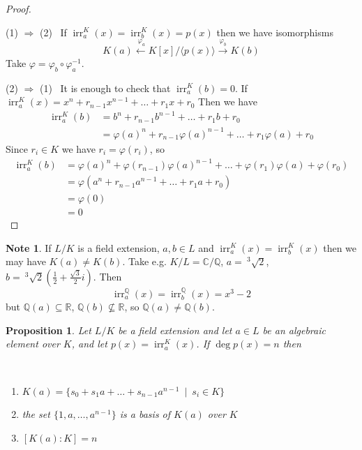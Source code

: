 \documentclass[12pt, letterpaper, oneside]{article}
\theoremstyle{plain}
\newtheorem{proposition}[theorem]{Proposition}
\theoremstyle{definition}
\newtheorem{note}[theorem]{Note}
\newcommand{\lra}{\longrightarrow}
\newcommand{\Q}{{\mathbb Q}}
\newcommand{\R}{{\mathbb R}}
\newcommand{\C}{{\mathbb C}}
\newcommand{\subgp}[1]{\langle#1\rangle}
\newcommand{\irr}{\operatorname{irr}}
\newcommand{\benu}{\begin{enumerate}}
\newcommand{\eenu}{\end{enumerate}}
\newcommand{\vs}{\vskip 5mm}
\newcommand{\isep}[1][0]{\setlength{\itemsep}{#1 mm}}
\begin{document}
\vs\vs

\begin{proof} \ 

(1) $\Rightarrow$ (2) \ If $\irr^{K}_{a}(x) = \irr^{K}_{b}(x) = p(x)$ then we have 
isomorphisms 
$$K(a) \overset{\ \varphi_{a}}{\longleftarrow} K[x]/\subgp{p(x)} \overset{\varphi_{b}}{\lra} K(b)$$
Take $\varphi = \varphi_{b}\circ \varphi_{a}^{-1}$.

\vs 

(2) $\Rightarrow$ (1) \ It is enough to check that $\irr^{K}_{a}(b) = 0$. If 
$\irr^{K}_{a}(x) = x^{n} + r_{n-1}x^{n-1} + {\dots} + r_{1}x + r_{0}$
Then we have 
\begin{align*}
\irr^{K}_{a}(b)  & =  b^{n} + r_{n-1}b^{n-1} + {\dots} + r_{1}b + r_{0} \\
& = \varphi(a)^{n} + r_{n-1}\varphi(a)^{n-1} + {\dots} + r_{1}\varphi(a) + r_{0}
\end{align*}
Since $r_{i}\in K$ we have $r_{i} = \varphi(r_{i})$, so 
\begin{align*}
\irr^{K}_{a}(b)  & = \varphi(a)^{n} + \varphi(r_{n-1})\varphi(a)^{n-1} + {\dots} + \varphi(r_{1})
\varphi(a) + \varphi(r_{0}) \\
& = \varphi( a^{n} + r_{n-1}a^{n-1} + {\dots} + r_{1}a + r_{0}) \\
& = \varphi(0) \\
&  = 0
\end{align*}


\end{proof}


\begin{note}
If $L/K$ is a field extension, $a, b\in L$ and $\irr^{K}_{a}(x) = \irr^{K}_{b}(x)$ then we may 
have $K(a)\neq K(b)$.  Take e.g. $K/L = \C/\Q$,  $a = \ ^{3}\!\!\!\sqrt{2}$,  
$b = \ ^{3}\!\!\!\sqrt{2}(\frac{1}{2} + \frac{\sqrt{3}}{2}i)$. Then 
$$\irr^{\Q}_{a}(x) = \irr^{\Q}_{b}(x) = x^{3}-2$$
but $\Q(a)\subseteq \R$, $\Q(b)\not \subseteq \R$, so $\Q(a)\neq \Q(b)$.
\end{note}


\vs\vs

\begin{proposition}
Let $L/K$ be a field extension and let $a\in L$ be an algebraic element over $K$, and
let $p(x) = \irr^{K}_{a}(x)$. If $\deg p(x) = n$ then 

\vskip -13mm

\ 
\benu
\isep
\item $K(a) = \{ s_{0} + s_{1}a + {\dots} + s_{n-1}a^{n-1} \ \mid \ s_{i} \in K \}$
\item the set $\{1, a, \dots, a^{n-1}\}$ is a basis of $K(a)$ over $K$
\item $[K(a) : K] = n$
\eenu 

\end{proposition}
\end{document}
